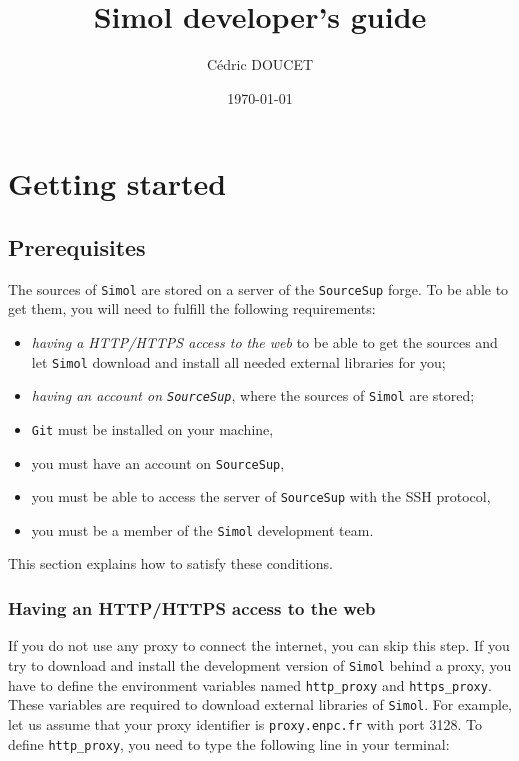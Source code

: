 \documentclass[12pt]{book}
\title{Simol developer's guide}
\author{C\'edric DOUCET}
\date{\today}
\newcommand{\Git}{\texttt{Git}\xspace}
\newcommand{\Simol}{\texttt{Simol}\xspace}
\newcommand{\SourceSup}{\texttt{SourceSup}\xspace}
\begin{document}
\maketitle
\tableofcontents



\chapter{Getting started}


\section{Prerequisites}

The sources of \Simol are stored on a server of the \SourceSup forge. To be able to get them, you will need to fulfill the following requirements:
\begin{itemize}
\item \textit{having a HTTP/HTTPS access to the web} to be able to get the sources and let \Simol download and install all needed external libraries for you; 
\item \textit{having an account on \SourceSup}, where the sources of \Simol are stored;
\item \Git must be installed on your machine,
\item you must have an account on \SourceSup,
\item you must be able to access the server of \SourceSup with the SSH protocol,
\item you must be a member of the \Simol development team.
\end{itemize}
This section explains how to satisfy these conditions.

\subsection{Having an HTTP/HTTPS access to the web}

If you do not use any proxy to connect the internet, you can skip this step. If you try to download and install the development version of \Simol behind a proxy, you have to define the environment variables named \texttt{http\_proxy} and \texttt{https\_proxy}. These variables are required to download external libraries of \Simol. For example, let us assume that your proxy identifier is \texttt{proxy.enpc.fr} with port 3128. To define \texttt{http\_proxy}, you need to type the following line in your terminal:
\end{document}
